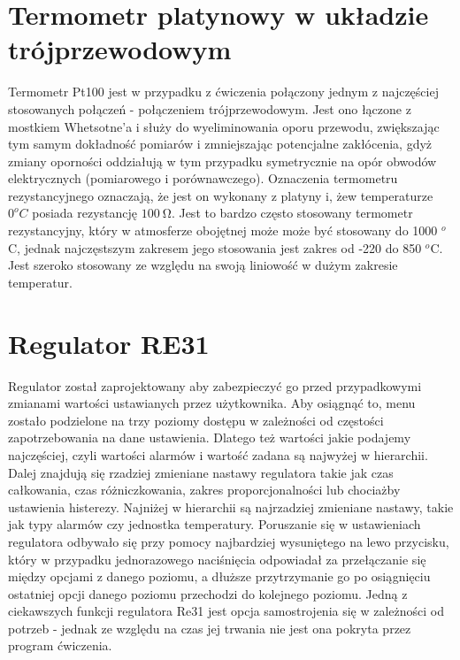 \documentclass[a4paper, 12pt]{article}
\begin{document}
	\section{Termometr platynowy w układzie trójprzewodowym}
		Termometr Pt100 jest w przypadku z ćwiczenia połączony jednym z najczęściej stosowanych połączeń - połączeniem trójprzewodowym. Jest ono łączone z mostkiem Whetsotne'a i służy do wyeliminowania oporu przewodu, zwiększając tym samym dokładność pomiarów i zmniejszając potencjalne zakłócenia, gdyż zmiany oporności oddziałują w tym przypadku symetrycznie na opór obwodów elektrycznych (pomiarowego i porównawczego). 
		\newline
		\newline
		Oznaczenia termometru rezystancyjnego oznaczają, że jest on wykonany z platyny i, że\linebreak w temperaturze $0^oC$ posiada rezystancję $100 \ \mathrm{\Omega}$. Jest to bardzo często stosowany termometr rezystancyjny, który w atmosferze obojętnej może może być stosowany do 1000 $^o$C, jednak najczęstszym zakresem jego stosowania jest zakres od -220 do 850 $^o$C. Jest szeroko stosowany ze względu na swoją liniowość w dużym zakresie temperatur. 
	\section{Regulator RE31}
		Regulator został zaprojektowany aby zabezpieczyć go przed przypadkowymi zmianami wartości ustawianych przez użytkownika. Aby osiągnąć to, menu zostało podzielone na trzy poziomy dostępu w zależności od częstości zapotrzebowania na dane ustawienia. Dlatego też wartości jakie podajemy najczęściej, czyli wartości alarmów i wartość zadana są najwyżej w hierarchii. Dalej znajdują się rzadziej zmieniane nastawy regulatora takie jak czas całkowania, czas różniczkowania, zakres proporcjonalności lub chociażby ustawienia histerezy. Najniżej w hierarchii są najrzadziej zmieniane nastawy, takie jak typy alarmów czy jednostka temperatury.
		\newline 
		\newline
		Poruszanie się w ustawieniach regulatora odbywało się przy pomocy najbardziej wysuniętego na lewo przycisku, który w przypadku jednorazowego naciśnięcia odpowiadał za przełączanie się między opcjami z danego poziomu, a dłuższe przytrzymanie go po osiągnięciu ostatniej opcji danego poziomu przechodzi do kolejnego poziomu. Jedną z ciekawszych funkcji regulatora Re31 jest opcja samostrojenia się w zależności od potrzeb - jednak ze względu na czas jej trwania nie jest ona pokryta przez program ćwiczenia.
\end{document}
